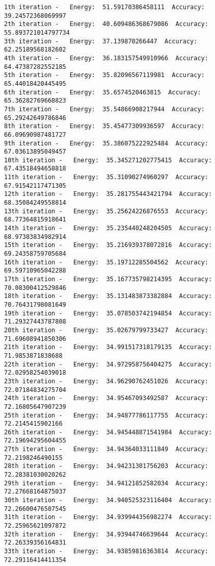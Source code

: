\documentclass[11pt]{article}
\begin{document}
    \begin{Verbatim}[commandchars=\\\{\}]
1th iteration -   Energy:  51.59170386458111  Accuracy:  39.24572368069997
2th iteration -   Energy:  40.609486368679086  Accuracy:  55.893721014797734
3th iteration -   Energy:  37.139870266447  Accuracy:  62.25189568182602
4th iteration -   Energy:  36.183157549910966  Accuracy:  64.47387282552185
5th iteration -   Energy:  35.82096567119981  Accuracy:  65.44018420445495
6th iteration -   Energy:  35.6574520463815  Accuracy:  65.36282769668823
7th iteration -   Energy:  35.54866908217944  Accuracy:  65.29242649786846
8th iteration -   Energy:  35.45477309936597  Accuracy:  66.09690987481727
9th iteration -   Energy:  35.386075222925484  Accuracy:  67.03613895049457
10th iteration -   Energy:  35.345271202775415  Accuracy:  67.43518494658818
11th iteration -   Energy:  35.31090274960297  Accuracy:  67.91542117471305
12th iteration -   Energy:  35.281755443421794  Accuracy:  68.35084249558814
13th iteration -   Energy:  35.25624226876553  Accuracy:  68.77364815918641
14th iteration -   Energy:  35.235440248204505  Accuracy:  68.97383834982914
15th iteration -   Energy:  35.216939378072816  Accuracy:  69.24358759705684
16th iteration -   Energy:  35.19712285504562  Accuracy:  69.59710965042288
17th iteration -   Energy:  35.167735798214395  Accuracy:  70.08300412529846
18th iteration -   Energy:  35.131483873382884  Accuracy:  70.76431798081649
19th iteration -   Energy:  35.078503742194854  Accuracy:  71.29327443787808
20th iteration -   Energy:  35.02679799733427  Accuracy:  71.69608941850306
21th iteration -   Energy:  34.991517318179135  Accuracy:  71.9853871838688
22th iteration -   Energy:  34.972958756404275  Accuracy:  72.02958254039018
23th iteration -   Energy:  34.96290762451026  Accuracy:  72.07184834275704
24th iteration -   Energy:  34.95467093492587  Accuracy:  72.16805647907239
25th iteration -   Energy:  34.94877786117755  Accuracy:  72.2145415902166
26th iteration -   Energy:  34.945448871541984  Accuracy:  72.19694295604455
27th iteration -   Energy:  34.94364033111849  Accuracy:  72.2198246490155
28th iteration -   Energy:  34.94231301756203  Accuracy:  72.28381030020262
29th iteration -   Energy:  34.94121852582034  Accuracy:  72.27668164875037
30th iteration -   Energy:  34.940525323116404  Accuracy:  72.26600476507545
31th iteration -   Energy:  34.939944356982274  Accuracy:  72.25965621097872
32th iteration -   Energy:  34.93944746639644  Accuracy:  72.26339356164831
33th iteration -   Energy:  34.93859816363814  Accuracy:  72.29116414411354

\end{Verbatim}
\end{document}
